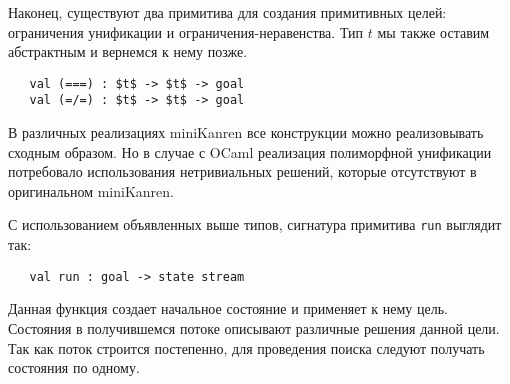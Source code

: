 
Наконец, существуют два примитива для создания примитивных целей: ограничения унификации и ограничения-неравенства. Тип  $t$ мы также оставим абстрактным и вернемся к нему позже.

\begin{lstlisting}
   val (===) : $t$ -> $t$ -> goal
   val (=/=) : $t$ -> $t$ -> goal
\end{lstlisting}


\noindent В различных реализациях miniKanren все конструкции можно реализовывать сходным образом.
Но в случае с OCaml реализация полиморфной унификации потребовало использования нетривиальных решений, которые отсутствуют в оригинальном miniKanren.


С использованием объявленных выше типов, сигнатура примитива \lstinline|run| выглядит так:

\begin{lstlisting}
   val run : goal -> state stream
\end{lstlisting}

\noindent Данная функция создает начальное состояние и применяет к нему цель. Состояния в получившемся потоке описывают различные решения данной цели.
Так как поток строится постепенно, для проведения поиска следуют получать состояния по одному.

